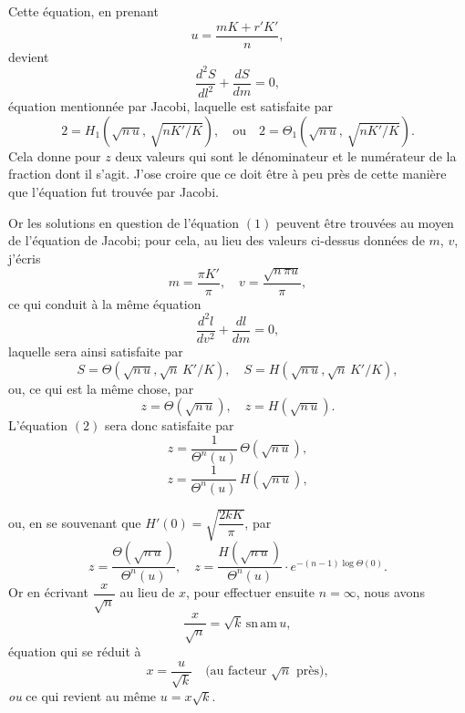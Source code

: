 \documentclass[11pt,a4paper]{article}
\begin{document}
\medskip

Cette \'{e}quation, en prenant
\[
u=\frac{mK+r'K'}{n},
\]
devient
\[
\frac{d^2S}{dl^2}+\frac{dS}{dm}=0,
\]
\'{e}quation mentionn\'{e}e par Jacobi, laquelle est satisfaite par
\[
2=H_1(\sqrt{n\,u},\,\sqrt{nK'/K}), \quad \text{ou}\quad 2=\Theta_1(\sqrt{n\,u},\,\sqrt{nK'/K}).
\]
Cela donne pour $z$ deux valeurs qui sont le d\'{e}nominateur et le num\'{e}rateur de la fraction dont il s'agit. J'ose croire que ce doit \^{e}tre \`{a} peu pr\`{e}s de cette mani\`{e}re que l'\'{e}quation fut trouv\'{e}e par Jacobi.

\medskip

Or les solutions en question de l'\'{e}quation $(1)$ peuvent \^{e}tre trouv\'{e}es au moyen de l'\'{e}quation de Jacobi; pour cela, au lieu des valeurs ci-dessus donn\'{e}es de $m$, $v$, j'\'{e}cris
\[
m=\frac{\pi K'}{\pi}, \quad v=\frac{\sqrt{n\,\pi u}}{\pi},
\]
ce qui conduit \`{a} la m\^{e}me \'{e}quation
\[
\frac{d^2l}{dv^2}+\frac{dl}{dm}=0,
\]
laquelle sera ainsi satisfaite par
\[
S=\Theta(\sqrt{n\,u},\sqrt{n}\,K'/K), \quad S=H(\sqrt{n\,u},\sqrt{n}\,K'/K),
\]
ou, ce qui est la m\^{e}me chose, par
\[
z=\Theta(\sqrt{n\,u}), \quad z=H(\sqrt{n\,u}).
\]
L'\'{e}quation $(2)$ sera donc satisfaite par
\[
z=\frac{1}{\Theta^n(u)}\,\Theta(\sqrt{n\,u}),
\]
\[
z=\frac{1}{\Theta^n(u)}\,H(\sqrt{n\,u}),
\]
\clearpage

\noindent ou, en se souvenant que $H'(0)=\sqrt{\dfrac{2kK}{\pi}}$, par
\[
z=\frac{\Theta(\sqrt{n\,u})}{\Theta^n(u)}, \quad z=\frac{H(\sqrt{n\,u})}{\Theta^n(u)}\cdot e^{-(n-1)\log\Theta(0)}.
\]
Or en \'{e}crivant $\dfrac{x}{\sqrt{n}}$ au lieu de $x$, pour effectuer ensuite $n=\infty$, nous avons
\[
\frac{x}{\sqrt{n}}=\sqrt{k}\,\mathrm{sn\,am}\,u,
\]
\'{e}quation qui se r\'{e}duit \`{a}
\[
x=\frac{u}{\sqrt{k}}\quad\text{(au facteur }\sqrt{n}\text{ pr\`{e}s)},
\]
\textit{ou} ce qui revient au m\^{e}me $u=x\sqrt{k}$.

\medskip
\end{document}
